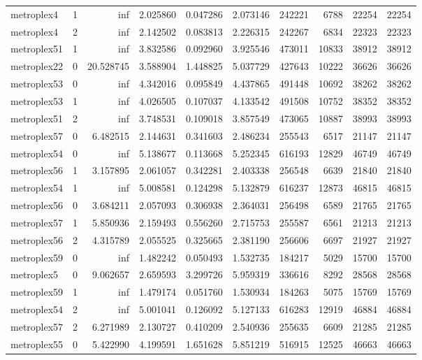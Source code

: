 \begin{longtable}{|l|r|r|r|r|r|r|r|r|r|}
metroplex4 & 1 & inf & 2.025860 & 0.047286 & 2.073146 & 242221 & 6788 & 22254 & 22254 \\
metroplex4 & 2 & inf & 2.142502 & 0.083813 & 2.226315 & 242267 & 6834 & 22323 & 22323 \\
metroplex51 & 1 & inf & 3.832586 & 0.092960 & 3.925546 & 473011 & 10833 & 38912 & 38912 \\
metroplex22 & 0 & 20.528745 & 3.588904 & 1.448825 & 5.037729 & 427643 & 10222 & 36626 & 36626 \\
metroplex53 & 0 & inf & 4.342016 & 0.095849 & 4.437865 & 491448 & 10692 & 38262 & 38262 \\
metroplex53 & 1 & inf & 4.026505 & 0.107037 & 4.133542 & 491508 & 10752 & 38352 & 38352 \\
metroplex51 & 2 & inf & 3.748531 & 0.109018 & 3.857549 & 473065 & 10887 & 38993 & 38993 \\
metroplex57 & 0 & 6.482515 & 2.144631 & 0.341603 & 2.486234 & 255543 & 6517 & 21147 & 21147 \\
metroplex54 & 0 & inf & 5.138677 & 0.113668 & 5.252345 & 616193 & 12829 & 46749 & 46749 \\
metroplex56 & 1 & 3.157895 & 2.061057 & 0.342281 & 2.403338 & 256548 & 6639 & 21840 & 21840 \\
metroplex54 & 1 & inf & 5.008581 & 0.124298 & 5.132879 & 616237 & 12873 & 46815 & 46815 \\
metroplex56 & 0 & 3.684211 & 2.057093 & 0.306938 & 2.364031 & 256498 & 6589 & 21765 & 21765 \\
metroplex57 & 1 & 5.850936 & 2.159493 & 0.556260 & 2.715753 & 255587 & 6561 & 21213 & 21213 \\
metroplex56 & 2 & 4.315789 & 2.055525 & 0.325665 & 2.381190 & 256606 & 6697 & 21927 & 21927 \\
metroplex59 & 0 & inf & 1.482242 & 0.050493 & 1.532735 & 184217 & 5029 & 15700 & 15700 \\
metroplex5 & 0 & 9.062657 & 2.659593 & 3.299726 & 5.959319 & 336616 & 8292 & 28568 & 28568 \\
metroplex59 & 1 & inf & 1.479174 & 0.051760 & 1.530934 & 184263 & 5075 & 15769 & 15769 \\
metroplex54 & 2 & inf & 5.001041 & 0.126092 & 5.127133 & 616283 & 12919 & 46884 & 46884 \\
metroplex57 & 2 & 6.271989 & 2.130727 & 0.410209 & 2.540936 & 255635 & 6609 & 21285 & 21285 \\
metroplex55 & 0 & 5.422990 & 4.199591 & 1.651628 & 5.851219 & 516915 & 12525 & 46663 & 46663 \\

\end{longtable}
